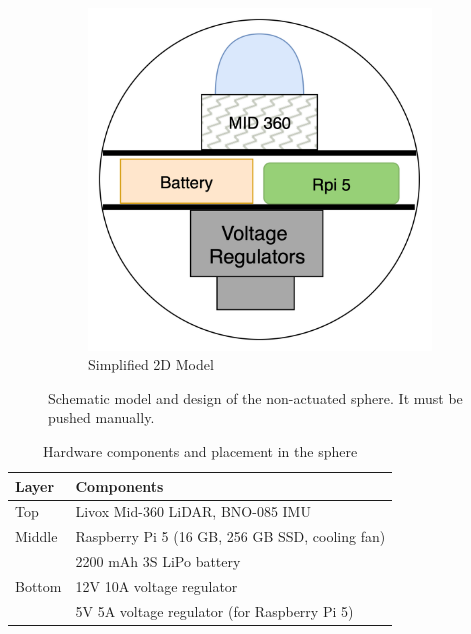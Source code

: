 \documentclass[english, bachelor, utf8]{base/thesis_telematics}
\begin{document}
\begin{figure}
\begin{subfigure}{0.4\columnwidth}
    \includegraphics[width=\textwidth]{pics/image.png}
    \caption{Simplified 2D Model}
    \label{fig:2d-model}
\end{subfigure}
\caption{Schematic model and design of the non-actuated sphere.
It must be pushed manually.}
\label{fig:cad-design1}
\end{figure}
\begin{table}
\centering
\caption{Hardware components and placement in the sphere}
\label{tab:hardware_components_non_actuated}
\begin{tabularx}{\linewidth}{@{}l X@{}}
\toprule
\textbf{Layer} & \textbf{Components} \\
\midrule
Top    & Livox Mid-360 LiDAR, BNO-085 IMU \\
Middle & Raspberry Pi 5 (16 GB, 256 GB SSD, cooling fan) \\
       & 2200 mAh 3S LiPo battery \\
Bottom & 12V 10A voltage regulator \\
       & 5V 5A voltage regulator (for Raspberry Pi 5) \\

\bottomrule
\end{tabularx}
\vspace{-1em}
\end{table}
\end{document}
